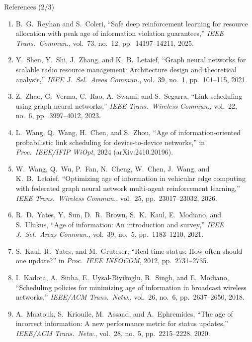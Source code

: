 \documentclass[aspectratio=169,10pt,xcolor=table]{beamer}
\begin{document}
\begin{frame}{References (2/3)}
  \scriptsize
  \begin{enumerate}\setlength\itemsep{0.25em}
    \item[{[9]}] B.~G.~Reyhan and S.~Coleri, ``Safe deep reinforcement learning for resource allocation with peak age of information violation guarantees,'' \emph{IEEE Trans.\ Commun.}, vol.~73, no.~12, pp.~14197--14211, 2025.
    \item[{[10]}] Y.~Shen, Y.~Shi, J.~Zhang, and K.~B.~Letaief, ``Graph neural networks for scalable radio resource management: Architecture design and theoretical analysis,'' \emph{IEEE J.\ Sel.\ Areas Commun.}, vol.~39, no.~1, pp.~101--115, 2021.
    \item[{[11]}] Z.~Zhao, G.~Verma, C.~Rao, A.~Swami, and S.~Segarra, ``Link scheduling using graph neural networks,'' \emph{IEEE Trans.\ Wireless Commun.}, vol.~22, no.~6, pp.~3997--4012, 2023.
    \item[{[12]}] L.~Wang, Q.~Wang, H.~Chen, and S.~Zhou, ``Age of information-oriented probabilistic link scheduling for device-to-device networks,'' in \emph{Proc.\ IEEE/IFIP WiOpt}, 2024 (arXiv:2410.20196).
    \item[{[13]}] W.~Wang, Q.~Wu, P.~Fan, N.~Cheng, W.~Chen, J.~Wang, and K.~B.~Letaief, ``Optimizing age of information in vehicular edge computing with federated graph neural network multi-agent reinforcement learning,'' \emph{IEEE Trans.\ Wireless Commun.}, vol.~25, pp.~23017--23032, 2026.
    \item[{[14]}] R.~D.~Yates, Y.~Sun, D.~R.~Brown, S.~K.~Kaul, E.~Modiano, and S.~Ulukus, ``Age of information: An introduction and survey,'' \emph{IEEE J.\ Sel.\ Areas Commun.}, vol.~39, no.~5, pp.~1183--1210, 2021.
    \item[{[15]}] S.~Kaul, R.~Yates, and M.~Gruteser, ``Real-time status: How often should one update?'' in \emph{Proc.\ IEEE INFOCOM}, 2012, pp.~2731--2735.
    \item[{[16]}] I.~Kadota, A.~Sinha, E.~Uysal-Biyikoglu, R.~Singh, and E.~Modiano, ``Scheduling policies for minimizing age of information in broadcast wireless networks,'' \emph{IEEE/ACM Trans.\ Netw.}, vol.~26, no.~6, pp.~2637--2650, 2018.
    \item[{[17]}] A.~Maatouk, S.~Kriouile, M.~Assaad, and A.~Ephremides, ``The age of incorrect information: A new performance metric for status updates,'' \emph{IEEE/ACM Trans.\ Netw.}, vol.~28, no.~5, pp.~2215--2228, 2020.
  \end{enumerate}
\end{frame}
\end{document}
